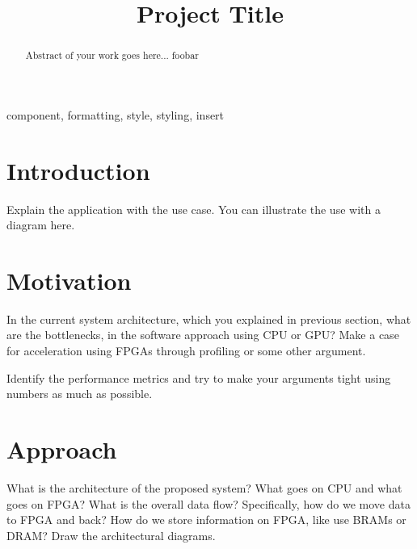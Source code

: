 \documentclass[conference]{IEEEtran}
\begin{document}
\title{Project Title}

\author{
\and
{}
}

\maketitle

\begin{abstract}
Abstract of your work goes here... foobar
\end{abstract}

\begin{IEEEkeywords}
component, formatting, style, styling, insert
\end{IEEEkeywords}

\section{Introduction}
Explain the application with the use case.  You can illustrate the use with a
diagram here.

\section{Motivation}
In the current system architecture, which you explained in previous section,
what are the bottlenecks, in the software approach using CPU or GPU?  Make a
case for acceleration using FPGAs through profiling or some other argument. 

Identify the performance metrics and try to make your arguments tight using 
numbers as much as possible.

\section{Approach}

What is the architecture of the proposed system? What goes on CPU and what 
goes on FPGA? What is the overall data flow? Specifically, how do we move data
to FPGA and back? How do we store information on FPGA, like use BRAMs or DRAM?
Draw the architectural diagrams. 
\end{document}
